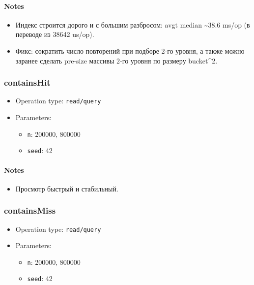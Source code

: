 \documentclass[
  10pt,
]{article}
\providecommand{\tightlist}{%
  \setlength{\itemsep}{0pt}\setlength{\parskip}{0pt}}
\begin{document}
\paragraph{Notes}\label{notes-11}

\begin{itemize}
\tightlist
\item
  Индекс строится дорого и с большим разбросом: avgt median
  \textasciitilde38.6 ms/op (в переводе из 38642 us/op).
\item
  Фикс: сократить число повторений при подборе 2-го уровня, а также
  можно заранее сделать pre-size массивы 2-го уровня по размеру
  bucket\^{}2.
\end{itemize}

\subsubsection{containsHit}\label{containshit}

\begin{itemize}
\tightlist
\item
  Operation type: \texttt{read/query}
\item
  Parameters:

  \begin{itemize}
  \tightlist
  \item
    \texttt{n}: 200000, 800000
  \item
    \texttt{seed}: 42
  \end{itemize}
\end{itemize}

\paragraph{Notes}\label{notes-12}

\begin{itemize}
\tightlist
\item
  Просмотр быстрый и стабильный.
\end{itemize}

\subsubsection{containsMiss}\label{containsmiss}

\begin{itemize}
\tightlist
\item
  Operation type: \texttt{read/query}
\item
  Parameters:

  \begin{itemize}
  \tightlist
  \item
    \texttt{n}: 200000, 800000
  \item
    \texttt{seed}: 42
  \end{itemize}
\end{itemize}
\end{document}
